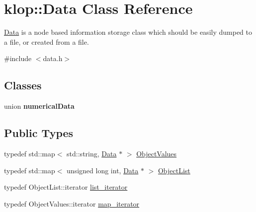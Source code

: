 \hypertarget{classklop_1_1Data}{
\section{klop::Data Class Reference}
\label{classklop_1_1Data}
}


\hyperlink{classklop_1_1Data}{Data} is a node based information storage class which should be easily dumped to a file, or created from a file.  




{\ttfamily \#include $<$data.h$>$}

\subsection*{Classes}
\begin{DoxyCompactItemize}
\item 
union {\bfseries numericalData}
\end{DoxyCompactItemize}
\subsection*{Public Types}
\begin{DoxyCompactItemize}
\item 
typedef std::map$<$ std::string, \hyperlink{classklop_1_1Data}{Data} $\ast$ $>$ \hyperlink{classklop_1_1Data_ab36e5c0e4f3265bb3e1698de7e073d03}{ObjectValues}
\item 
typedef std::map$<$ unsigned long int, \hyperlink{classklop_1_1Data}{Data} $\ast$ $>$ \hyperlink{classklop_1_1Data_aee446ab95da6d53fe52203d8ea967742}{ObjectList}
\item 
typedef ObjectList::iterator \hyperlink{classklop_1_1Data_a8bcb1ee1639616047953b2459319ea3c}{list\_\-iterator}
\item 
typedef ObjectValues::iterator \hyperlink{classklop_1_1Data_ae1c3cec24a9d3a5cd53693f5d34195f2}{map\_\-iterator}
\end{DoxyCompactItemize}

